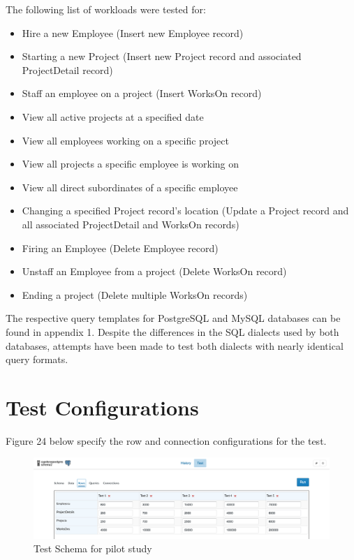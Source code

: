 \documentclass[12pt]{report}
\begin{document}
\begin{spacing}{1.9}
	The following list of workloads were tested for:
	\begin{itemize}
		
		\item Hire a new Employee (Insert new Employee record)
		\item Starting a new Project (Insert new Project record and associated ProjectDetail record)
		\item Staff an employee on a project (Insert WorksOn record)
		\item View all active projects at a specified date
		\item View all employees working on a specific project
		\item View all projects a specific employee is working on
		\item View all direct subordinates of a specific employee
		\item Changing a specified Project record's location (Update a Project record and all associated ProjectDetail and WorksOn records)
		\item Firing an Employee (Delete Employee record)
		\item Unstaff an Employee from a project (Delete WorksOn record)
		\item Ending a project (Delete multiple WorksOn records)
	\end{itemize}
	
	The respective query templates for PostgreSQL and MySQL databases can be found in appendix 1. Despite the differences in the SQL dialects used by both databases, attempts have been made to test both dialects with nearly identical query formats.
	
	\section{Test Configurations}
	
	Figure 24 below specify the row and connection configurations for the test.
	
	\begin{figure}[H]
		\centering
		\includegraphics[width=\textwidth]{4-3.png}
		\caption{Test Schema for pilot study}
		

\end{figure}
\end{spacing}
\end{document}
